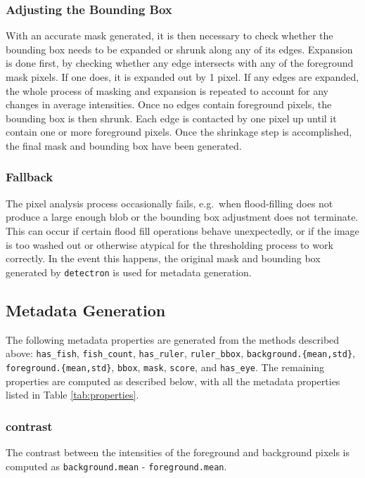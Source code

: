 \documentclass[conference]{IEEEtran}
\begin{document}
\subsubsection{Adjusting the Bounding Box}
With an accurate mask generated, it is then necessary to check whether the bounding box needs to be expanded or shrunk along any of its edges.
Expansion is done first, by checking whether any edge intersects with any of the foreground mask pixels. If one does, it is expanded out by 1 pixel. If any edges are expanded, the whole process of masking and expansion is repeated to account for any changes in average intensities. Once no edges contain foreground pixels, the bounding box is then shrunk.
Each edge is contacted by one pixel up until it contain one or more foreground pixels. Once the shrinkage step is accomplished, the final mask and bounding box have been generated.

\subsubsection{Fallback} The pixel analysis process occasionally fails,
e.g.\ when flood-filling does not produce a large enough blob or
the bounding box adjustment does not terminate.
This can occur if certain flood fill operations behave unexpectedly, or if the image is too washed out or otherwise atypical for the thresholding process to work correctly. In the event this happens, the original mask and bounding box generated by \verb|detectron| is used for metadata generation.

\subsection{Metadata Generation}

The following metadata properties are generated from the methods
described above:
\verb|has_fish|, \verb|fish_count|, \verb|has_ruler|, \verb|ruler_bbox|, \verb|background.{mean,std}|, \verb|foreground.{mean,std}|, \verb|bbox|, \verb|mask|, \verb|score|, and \verb|has_eye|.
The remaining properties are computed as described below, with all the
metadata properties listed in Table \ref{tab:properties}.

\subsubsection{contrast}
The contrast between the intensities of the foreground and background
pixels is computed as \verb|background.mean| - \verb|foreground.mean|.
\end{document}

